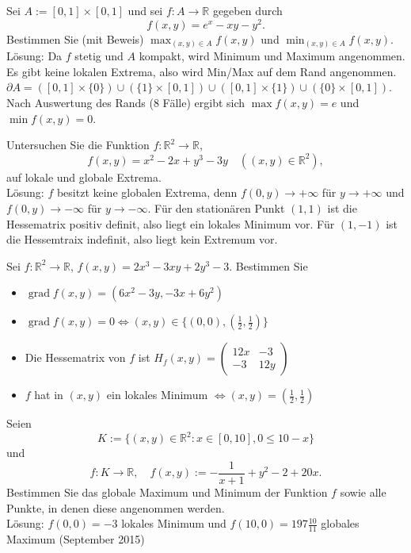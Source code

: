 \documentclass[parskip=full]{scrartcl}
\DeclareMathOperator{\grad}{grad}
\begin{document}
Sei $A := [0,1] \times [0,1]$ und sei $f : A \to \mathbb{R}$ gegeben durch
\begin{displaymath}
  f(x,y) = e^x - xy - y^2.
\end{displaymath}
Bestimmen Sie (mit Beweis) $\max_{(x,y) \in A} f(x,y)$ und $\min_{(x,y) \in A} f(x,y)$.\\
Lösung:
Da $f$ stetig und $A$ kompakt, wird Minimum und Maximum angenommen.
Es gibt keine lokalen Extrema, also wird Min/Max auf dem Rand angenommen.
$\partial A = ([0,1] \times \{0\}) \cup (\{1\} \times [0,1]) \cup ([0,1] \times \{1\}) \cup (\{0\} \times [0,1])$.
Nach Auswertung des Rands (8 Fälle) ergibt sich $\max f(x,y) = e$ und $\min f(x,y) = 0$.

Untersuchen Sie die Funktion $f : \mathbb{R}^2 \to \mathbb{R}$,
\begin{displaymath}
  f(x,y) = x^2 - 2x + y^3 - 3y \quad ((x,y) \in \mathbb{R}^2),
\end{displaymath}
auf lokale und globale Extrema.\\
Lösung:
$f$ besitzt keine globalen Extrema, denn $f(0,y) \to +\infty$ für $y \to +\infty$ und $f(0,y) \to -\infty$ für $y \to -\infty$.
Für den stationären Punkt $(1,1)$ ist die Hessematrix positiv definit, also liegt ein lokales Minimum vor.
Für $(1,-1)$ ist die Hessemtraix indefinit, also liegt kein Extremum vor.

Sei $f : \mathbb{R}^2 \to \mathbb{R}$, $f(x,y) = 2x^3 - 3xy + 2y^3 - 3$.
Bestimmen Sie
\begin{itemize}
    \item $\grad f(x,y) = (6x^2 - 3y, -3x + 6y^2)$
    \item $\grad f(x,y) = 0 \iff (x,y) \in \{(0,0), \left(\frac{1}{2}, \frac{1}{2}\right)\}$
    \item Die Hessematrix von $f$ ist $H_f(x,y) = \begin{pmatrix} 12x & -3\\-3 & 12y\end{pmatrix}$
    \item $f$ hat in $(x,y)$ ein lokales Minimum $\iff (x,y) = \left(\frac{1}{2}, \frac{1}{2}\right)$
\end{itemize}

Seien
\begin{displaymath}
  K := \{(x,y) \in \mathbb{R}^2 : x\in [0,10], 0 \leq 10 - x\}
\end{displaymath}
und
\begin{displaymath}
  f : K \to \mathbb{R}, \quad f(x,y) := - \frac{1}{x + 1} + y^2 - 2 + 20x.
\end{displaymath}
Bestimmen Sie das globale Maximum und Minimum der Funktion $f$ sowie alle Punkte, in denen diese angenommen werden.\\
Lösung:
$f(0,0) = -3$ lokales Minimum und $f(10,0) = 197 \frac{10}{11}$ globales Maximum
(September 2015)
\end{document}
